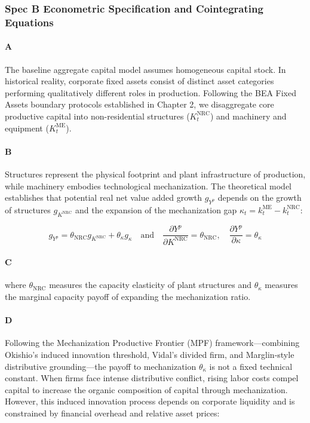 \subsubsection{Spec B Econometric Specification and Cointegrating Equations}

\paragraph{A}
The baseline aggregate capital model assumes homogeneous capital stock. In historical reality, corporate fixed assets consist of distinct asset categories performing qualitatively different roles in production. Following the BEA Fixed Assets boundary protocols established in Chapter 2, we disaggregate core productive capital into non-residential structures ($K_t^{\text{NRC}}$) and machinery and equipment ($K_t^{\text{ME}}$).

\paragraph{B}
Structures represent the physical footprint and plant infrastructure of production, while machinery embodies technological mechanization. The theoretical model establishes that potential real net value added growth $g_{Y^p}$ depends on the growth of structures $g_{K^{\text{NRC}}}$ and the expansion of the mechanization gap $\kappa_t = k_t^{\text{ME}} - k_t^{\text{NRC}}$:

\[g_{Y^p} = \theta_{\text{NRC}} g_{K^{\text{NRC}}} + \theta_{\kappa} g_{\kappa} \quad \text{and} \quad \frac{\partial Y^p}{\partial K^{\text{NRC}}} = \theta_{\text{NRC}}, \quad \frac{\partial Y^p}{\partial \kappa} = \theta_{\kappa}\]

\paragraph{C}
where $\theta_{\text{NRC}}$ measures the capacity elasticity of plant structures and $\theta_{\kappa}$ measures the marginal capacity payoff of expanding the mechanization ratio.

\paragraph{D}
Following the Mechanization Productive Frontier (MPF) framework—combining Okishio's induced innovation threshold, Vidal's divided firm, and Marglin-style distributive grounding—the payoff to mechanization $\theta_{\kappa}$ is not a fixed technical constant. When firms face intense distributive conflict, rising labor costs compel capital to increase the organic composition of capital through mechanization. However, this induced innovation process depends on corporate liquidity and is constrained by financial overhead and relative asset prices:


